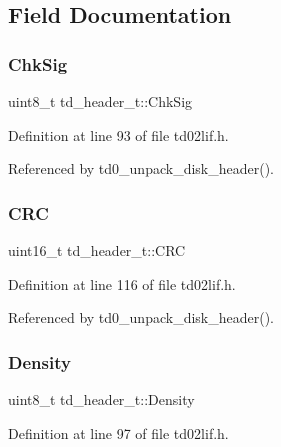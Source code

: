 \subsection{Field Documentation}
\mbox{\label{structtd__header__t_ad226c52f8f8481b0ebf826dd3128ba3d}} 
\subsubsection{\texorpdfstring{Chk\+Sig}{ChkSig}}
{\footnotesize\ttfamily uint8\+\_\+t td\+\_\+header\+\_\+t\+::\+Chk\+Sig}



Definition at line 93 of file td02lif.\+h.



Referenced by td0\+\_\+unpack\+\_\+disk\+\_\+header().

\mbox{\label{structtd__header__t_ae51197a200b65947359773f1aeea9c2d}} 
\subsubsection{\texorpdfstring{C\+RC}{CRC}}
{\footnotesize\ttfamily uint16\+\_\+t td\+\_\+header\+\_\+t\+::\+C\+RC}



Definition at line 116 of file td02lif.\+h.



Referenced by td0\+\_\+unpack\+\_\+disk\+\_\+header().

\mbox{\label{structtd__header__t_a09c0c52ec99733db61dd6f3c7d052325}} 
\subsubsection{\texorpdfstring{Density}{Density}}
{\footnotesize\ttfamily uint8\+\_\+t td\+\_\+header\+\_\+t\+::\+Density}



Definition at line 97 of file td02lif.\+h.



